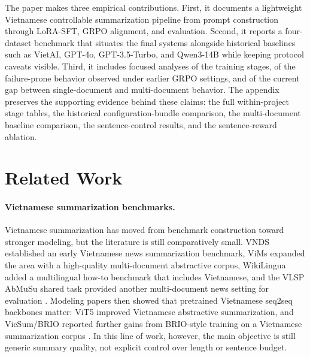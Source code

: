 \documentclass[11pt]{article}
\begin{document}
The paper makes three empirical contributions.
First, it documents a lightweight Vietnamese controllable summarization pipeline from prompt construction through LoRA-SFT, GRPO alignment, and evaluation.
Second, it reports a four-dataset benchmark that situates the final systems alongside historical baselines such as VietAI, GPT-4o, GPT-3.5-Turbo, and Qwen3-14B while keeping protocol caveats visible.
Third, it includes focused analyses of the training stages, of the failure-prone behavior observed under earlier GRPO settings, and of the current gap between single-document and multi-document behavior.
The appendix preserves the supporting evidence behind these claims: the full within-project stage tables, the historical configuration-bundle comparison, the multi-document baseline comparison, the sentence-control results, and the sentence-reward ablation.


\section{Related Work}
\paragraph{Vietnamese summarization benchmarks.}
Vietnamese summarization has moved from benchmark construction toward stronger modeling, but the literature is still comparatively small.
VNDS established an early Vietnamese news summarization benchmark, ViMs expanded the area with a high-quality multi-document abstractive corpus, WikiLingua added a multilingual how-to benchmark that includes Vietnamese, and the VLSP AbMuSu shared task provided another multi-document news setting for evaluation \citep{nguyen2019vnds,tran2020vims,ladhak2020wikilingua,tran2023abmusu}.
Modeling papers then showed that pretrained Vietnamese seq2seq backbones matter: ViT5 improved Vietnamese abstractive summarization, and VieSum/BRIO reported further gains from BRIO-style training on a Vietnamese summarization corpus \citep{phan2022vit5,lam2023viesum}.
In this line of work, however, the main objective is still generic summary quality, not explicit control over length or sentence budget.
\end{document}
